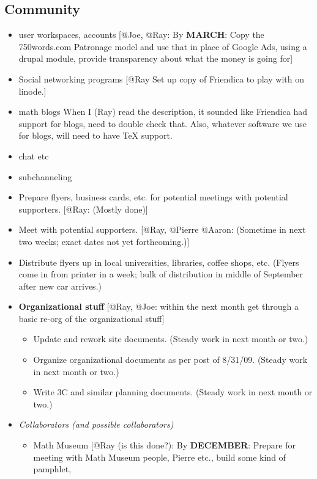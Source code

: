 \subsection*{Community}
\begin{itemize}
\item user workspaces, accounts [@Joe, @Ray: By {\bf MARCH}: Copy the 750words.com
   Patronage model and use that in place of Google Ads,
   using a drupal module, provide transparency about what
   the money is going for]
\item Social networking programs
[@Ray Set up copy of Friendica to play with on linode.]
\item math blogs
When I (Ray) read the description, it sounded like Friendica had
support for blogs, need to double check that.   Also, whatever software
we use for blogs, will need to have TeX support.
\item chat etc                   
\item subchanneling
\item Prepare flyers, business cards, etc. for potential meetings
with potential supporters.  [@Ray: (Mostly done)]
\item Meet with potential supporters.  [@Ray, @Pierre @Aaron: (Sometime in next two weeks; exact dates not yet forthcoming.)] 
\item Distribute flyers up in local universities, libraries, coffee shops, etc.  (Flyers come in from printer in a week; bulk of distribution in middle of September after new car arrives.)
\item {\bf Organizational stuff} [@Ray, @Joe: within the next month get through a basic re-org of the organizational stuff]
  \begin{itemize}
  \item Update and rework site documents.  (Steady work in next month or two.)
  \item Organize organizational documents as per post of 8/31/09. (Steady work in next month or two.)
  \item Write 3C and similar planning documents. (Steady work in next month or two.)
  \end{itemize}
\item \emph{Collaborators (and possible collaborators)}
  \begin{itemize}
  \item Math Museum [@Ray (is this done?): By {\bf DECEMBER}: Prepare for meeting with Math Museum people, Pierre etc., build some kind of pamphlet,

\end{itemize}
\end{itemize}

